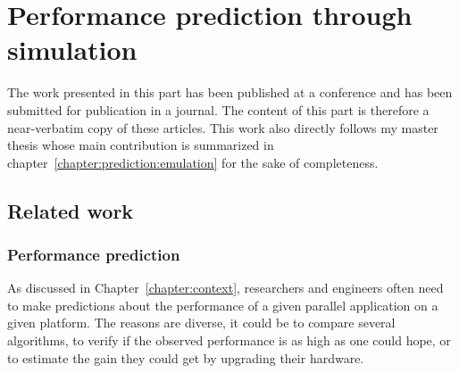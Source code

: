 \part{Performance prediction through simulation}
\label{part:prediction}

The work presented in this part has been published at a conference\cite{cornebize:cluster19} and has been submitted
for publication in a journal. The content of this part is therefore a near-verbatim copy of these articles. This work
also directly follows my master thesis\cite{cornebize:master_thesis} whose main contribution is summarized in
chapter~\ref{chapter:prediction:emulation} for the sake of completeness.

\chapter{Related work}%
\label{chapter:prediction:related_work}


    \section{Performance prediction}%
    \label{sec:performance_prediction}

        As discussed in Chapter~\ref{chapter:context}, researchers and engineers often need to make predictions about
        the performance of a given parallel application on a given platform. The reasons are diverse, it could be to
        compare several algorithms, to verify if the observed performance is as high as one could hope, or to estimate
        the gain they could get by upgrading their hardware.

